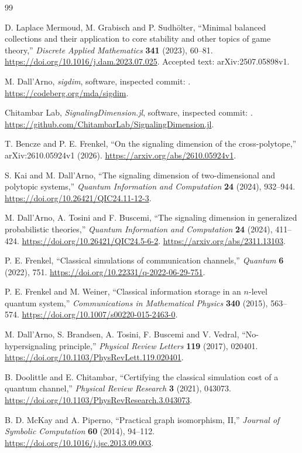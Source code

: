 \documentclass[11pt]{article}
\begin{document}
\begin{thebibliography}{99}
\sloppy

D. Laplace Mermoud, M. Grabisch and P. Sudh\"olter,
``Minimal balanced collections and their application to core stability and
other topics of game theory,'' \emph{Discrete Applied Mathematics}
\textbf{341} (2023), 60--81.
\url{https://doi.org/10.1016/j.dam.2023.07.025}.
Accepted text: arXiv:2507.05898v1.

M. Dall'Arno, \emph{sigdim}, software, inspected commit:\newline
{}.
\url{https://codeberg.org/mda/sigdim}.

Chitambar Lab, \emph{SignalingDimension.jl}, software, inspected commit:\newline
{}.
\url{https://github.com/ChitambarLab/SignalingDimension.jl}.

T. Bencze and P. E. Frenkel,
``On the signaling dimension of the cross-polytope,''
arXiv:2610.05924v1 (2026).
\url{https://arxiv.org/abs/2610.05924v1}.

S. Kai and M. Dall'Arno,
``The signaling dimension of two-dimensional and polytopic systems,''
\emph{Quantum Information and Computation} \textbf{24} (2024), 932--944.
\url{https://doi.org/10.26421/QIC24.11-12-3}.

M. Dall'Arno, A. Tosini and F. Buscemi,
``The signaling dimension in generalized probabilistic theories,''
\emph{Quantum Information and Computation} \textbf{24} (2024), 411--424.
\url{https://doi.org/10.26421/QIC24.5-6-2}.
\url{https://arxiv.org/abs/2311.13103}.

P. E. Frenkel,
``Classical simulations of communication channels,''
\emph{Quantum} \textbf{6} (2022), 751.
\url{https://doi.org/10.22331/q-2022-06-29-751}.

P. E. Frenkel and M. Weiner,
``Classical information storage in an $n$-level quantum system,''
\emph{Communications in Mathematical Physics} \textbf{340} (2015), 563--574.
\url{https://doi.org/10.1007/s00220-015-2463-0}.

M. Dall'Arno, S. Brandsen, A. Tosini, F. Buscemi and V. Vedral,
``No-hypersignaling principle,''
\emph{Physical Review Letters} \textbf{119} (2017), 020401.
\url{https://doi.org/10.1103/PhysRevLett.119.020401}.

B. Doolittle and E. Chitambar,
``Certifying the classical simulation cost of a quantum channel,''
\emph{Physical Review Research} \textbf{3} (2021), 043073.
\newline
\url{https://doi.org/10.1103/PhysRevResearch.3.043073}.

B. D. McKay and A. Piperno,
``Practical graph isomorphism, II,''
\emph{Journal of Symbolic Computation} \textbf{60} (2014), 94--112.
\url{https://doi.org/10.1016/j.jsc.2013.09.003}.

\end{thebibliography}
\end{document}
